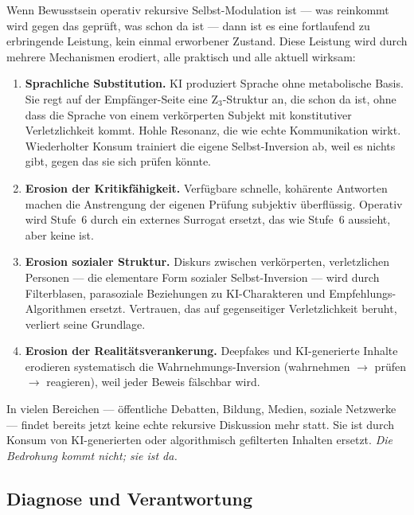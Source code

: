Wenn Bewusstsein operativ rekursive Selbst-Modulation ist --- was reinkommt wird gegen das geprüft, was schon da ist --- dann ist es eine fortlaufend zu erbringende Leistung, kein einmal erworbener Zustand. Diese Leistung wird durch mehrere Mechanismen erodiert, alle praktisch und alle aktuell wirksam:

\begin{enumerate}
\item \textbf{Sprachliche Substitution.} KI produziert Sprache ohne metabolische Basis. Sie regt auf der Empfänger-Seite eine Z$_3$-Struktur an, die schon da ist, ohne dass die Sprache von einem verkörperten Subjekt mit konstitutiver Verletzlichkeit kommt. Hohle Resonanz, die wie echte Kommunikation wirkt. Wiederholter Konsum trainiert die eigene Selbst-Inversion ab, weil es nichts gibt, gegen das sie sich prüfen könnte.
\item \textbf{Erosion der Kritikfähigkeit.} Verfügbare schnelle, kohärente Antworten machen die Anstrengung der eigenen Prüfung subjektiv überflüssig. Operativ wird Stufe~6 durch ein externes Surrogat ersetzt, das wie Stufe~6 aussieht, aber keine ist.
\item \textbf{Erosion sozialer Struktur.} Diskurs zwischen verkörperten, verletzlichen Personen --- die elementare Form sozialer Selbst-Inversion --- wird durch Filterblasen, parasoziale Beziehungen zu KI-Charakteren und Empfehlungs-Algorithmen ersetzt. Vertrauen, das auf gegenseitiger Verletzlichkeit beruht, verliert seine Grundlage.
\item \textbf{Erosion der Realitätsverankerung.} Deepfakes und KI-generierte Inhalte erodieren systematisch die Wahrnehmungs-Inversion (wahrnehmen $\to$ prüfen $\to$ reagieren), weil jeder Beweis fälschbar wird.
\end{enumerate}

\begin{important}
In vielen Bereichen --- öffentliche Debatten, Bildung, Medien, soziale Netzwerke --- findet bereits jetzt keine echte rekursive Diskussion mehr statt. Sie ist durch Konsum von KI-generierten oder algorithmisch gefilterten Inhalten ersetzt. \emph{Die Bedrohung kommt nicht; sie ist da.}
\end{important}

\subsection{Diagnose und Verantwortung}\label{sec:konsequenzen_diagnose}


